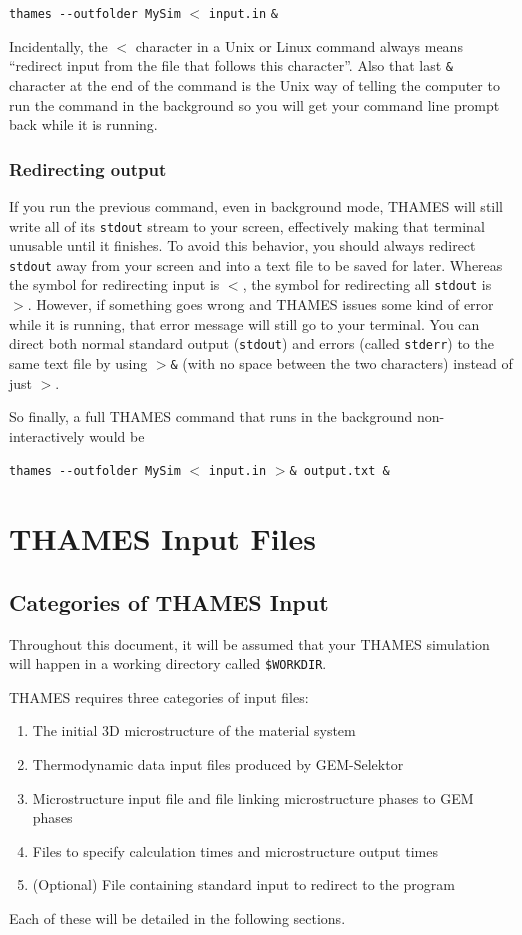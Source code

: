 \documentclass{article}
\begin{document}
\parspace
\small{
	\verb|thames --outfolder MySim| $<$ \verb|input.in| \verb|&|
} \normalsize

Incidentally, the $<$ character in a Unix or Linux command always means ``redirect input
from the file that follows this character''.  Also that last \verb|&| character at the
end of the command is the Unix way of telling the computer to run the command in the
background so you will get your command line prompt back while it is running.

\subsubsection{\label{sec:redirectingoutput} Redirecting output}
If you run the previous command, even in background mode, THAMES will still
write all of its \verb|stdout| stream to your screen, effectively making that
terminal unusable until it finishes. To avoid this behavior, you should always
redirect \verb|stdout| away from your screen and into a text file to be saved
for later. Whereas the symbol for redirecting input is $<$, the symbol for
redirecting all \verb|stdout| is $>$.  However, if something goes wrong and
THAMES issues some kind of error while it is running, that error message will
still go to your terminal. You can direct both normal standard output
(\verb|stdout|) and errors
(called \verb|stderr|) to the same text file by using $>$\verb|&| (with no space
between the two characters) instead of just $>$.

So finally, a full THAMES command that runs in the background non-interactively
would be

\parspace
\small{
	\verb|thames --outfolder MySim| $<$ \verb|input.in| $>$\verb|& output.txt &|
} \normalsize


\section{\label{sec:inputguide} THAMES Input Files}
\subsection{\label{sec:inputcategories} Categories of THAMES Input}
Throughout this document, it will be assumed that your THAMES simulation will happen
in a working directory called \verb!$WORKDIR!.

THAMES requires three categories of input files:
\begin{enumerate}
	\item The initial 3D microstructure of the material system
	\item Thermodynamic data input files produced by GEM-Selektor
	\item Microstructure input file and file linking microstructure phases to GEM phases
	\item Files to specify calculation times and microstructure output times
	\item (Optional) File containing standard input to redirect to the program
\end{enumerate}
Each of these will be detailed in the following sections.
\end{document}
